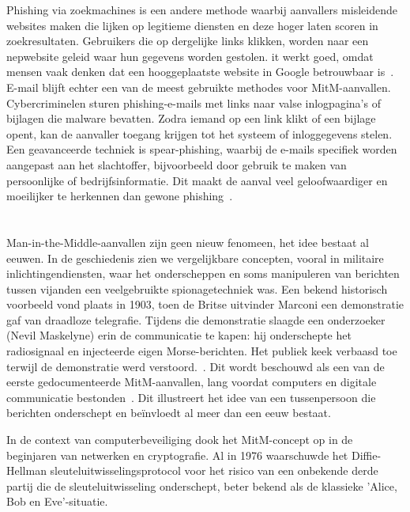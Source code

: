 Phishing via zoekmachines is een andere methode waarbij aanvallers misleidende websites maken die lijken op legitieme diensten en deze hoger laten scoren in zoekresultaten. Gebruikers die op dergelijke links klikken, worden naar een nepwebsite geleid waar hun gegevens worden gestolen. it werkt goed, omdat mensen vaak denken dat een hooggeplaatste website in Google betrouwbaar is~\autocite{birlea2020}.
E-mail blijft echter een van de meest gebruikte methodes voor MitM-aanvallen. Cybercriminelen sturen phishing-e-mails met links naar valse inlogpagina’s of bijlagen die malware bevatten. Zodra iemand op een link klikt of een bijlage opent, kan de aanvaller toegang krijgen tot het systeem of inloggegevens stelen. Een geavanceerde techniek is spear-phishing, waarbij de e-mails specifiek worden aangepast aan het slachtoffer, bijvoorbeeld door gebruik te maken van persoonlijke of bedrijfsinformatie. Dit maakt de aanval veel geloofwaardiger en moeilijker te herkennen dan gewone phishing~\autocite{birlea2020}.

\section{}
\label{sec:MitM-geschiedenis}



Man-in-the-Middle-aanvallen zijn geen nieuw fenomeen, het idee bestaat al eeuwen. In de geschiedenis zien we vergelijkbare concepten, vooral in militaire inlichtingendiensten, waar het onderscheppen en soms manipuleren van berichten tussen vijanden een veelgebruikte spionagetechniek was. Een bekend historisch voorbeeld vond plaats in 1903, toen de Britse uitvinder Marconi een demonstratie gaf van draadloze telegrafie. Tijdens die demonstratie slaagde een onderzoeker (Nevil Maskelyne) erin de communicatie te kapen: hij onderschepte het radiosignaal en injecteerde eigen Morse-berichten. Het publiek keek verbaasd toe terwijl de demonstratie werd verstoord.~\autocite{nexus2023}. Dit wordt beschouwd als een van de eerste gedocumenteerde MitM-aanvallen, lang voordat computers en digitale communicatie bestonden~\autocite{nexus2023}. Dit illustreert het idee van een tussenpersoon die berichten onderschept en beïnvloedt al meer dan een eeuw bestaat.

In de context van computerbeveiliging dook het MitM-concept op in de beginjaren van netwerken en cryptografie. Al in 1976 waarschuwde het Diffie-Hellman sleuteluitwisselingsprotocol voor het risico van een onbekende derde partij die de sleuteluitwisseling onderschept, beter bekend als de klassieke 'Alice, Bob en Eve'-situatie.~\autocite{DiffieHellman1976}

